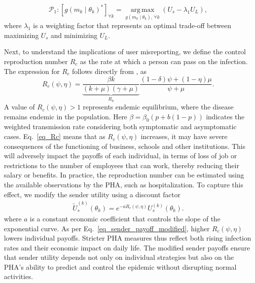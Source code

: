 \documentclass[sigconf,review]{acmart}
\DeclareMathOperator*{\argmax}{arg\,max}
\begin{document}
\begin{equation}
\mathcal{P}_1:\left[g(m_k \mid \theta_k)^{\ast}\right]_{\forall k} = \argmax\limits_{g(m_k \mid \theta_k),\, \forall k} \left( U_s - \lambda_1 U_L \right),
\end{equation}
where $\lambda_1$ is a weighting factor that represents an optimal trade-off between maximizing $U_s$ and minimizing $U_L$.


Next, to  understand  the   implications of user    misreporting, we define the control reproduction number $R_c$ as the rate at which a person can pass on the infection. The expression for $R_c$ follows  directly from \cite{ChoiJTB2020}, as
\begin{equation}
    R_c(\psi,\eta) = \underbrace{\frac{\beta k}{(k+\mu)(\gamma + \mu)}}_{R_0}\frac{(1-\delta)\psi + (1-\eta)\mu}{\psi + \mu}.
\label{eq_Rc}
\end{equation} 
A value of $R_c(\psi,\eta)>1$ represents endemic equilibrium, where the disease remains endemic in the population. Here $\beta = \beta_0(p+b(1-p))$  indicates the weighted transmission rate considering both symptomatic and asymptomatic
cases. Eq.~\eqref{eq_Rc} means that as  $R_c(\psi,\eta)$ increases, it may have severe consequences of the functioning of business, schools and other institutions. This will adversely impact the payoffs of each individual, in terms of loss of job or restrictions to the number of employees that can work, thereby reducing their salary or benefits. In practice, the reproduction number can be estimated using the available observations  \cite{ShiArxiv2025} by the PHA, such as hospitalization. 
To capture this effect, we modify the sender utility using a discount factor
\begin{equation}
\begin{aligned}
\widetilde{U}_s^{(k)}(\theta_k)
=
e^{-aR_c(\psi,\eta)}
U_s^{(k)}(\theta_k).
\end{aligned}
\label{eq_sender_payoff_modified}
\end{equation}
where $a$ is a constant economic coefficient that controls the slope of  the exponential  curve.
As per Eq.~\eqref{eq_sender_payoff_modified}, higher $R_c(\psi,\eta)$ lowers individual payoffs. Stricter PHA measures thus reflect both rising infection rates and their economic impact on daily life. The modified sender payoffs ensure that sender utility depends not only on individual strategies but also on the PHA’s ability to predict and control the epidemic without disrupting normal activities.
\end{document}

